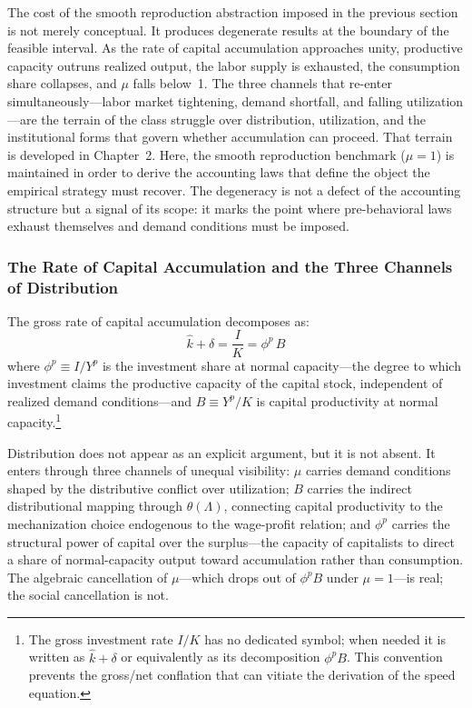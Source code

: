 The cost of the smooth reproduction abstraction imposed in the previous section is not merely conceptual. It produces degenerate results at the boundary of the feasible interval. As the rate of capital accumulation approaches unity, productive capacity outruns realized output, the labor supply is exhausted, the consumption share collapses, and $\mu$ falls below~1. The three channels that re-enter simultaneously---labor market tightening, demand shortfall, and falling utilization---are the terrain of the class struggle over distribution, utilization, and the institutional forms that govern whether accumulation can proceed. That terrain is developed in Chapter~2. Here, the smooth reproduction benchmark ($\mu = 1$) is maintained in order to derive the accounting laws that define the object the empirical strategy must recover. The degeneracy is not a defect of the accounting structure but a signal of its scope: it marks the point where pre-behavioral laws exhaust themselves and demand conditions must be imposed.


\subsubsection{The Rate of Capital Accumulation and the Three Channels of Distribution}
\label{sec:rate_of_accumulation}

The gross rate of capital accumulation decomposes as:
%
\begin{equation}\label{eq:gross_rate}
	\hat{k} + \delta = \frac{I}{K} = \phi^p \, B
\end{equation}
%
where $\phi^p \equiv I/Y^p$ is the investment share at normal capacity---the degree to which investment claims the productive capacity of the capital stock, independent of realized demand conditions---and $B \equiv Y^p/K$ is capital productivity at normal capacity.\footnote{The gross investment rate $I/K$ has no dedicated symbol; when needed it is written as $\hat{k} + \delta$ or equivalently as its decomposition $\phi^p B$. This convention prevents the gross/net conflation that can vitiate the derivation of the speed equation.}

Distribution does not appear as an explicit argument, but it is not absent. It enters through three channels of unequal visibility: $\mu$ carries demand conditions shaped by the distributive conflict over utilization; $B$ carries the indirect distributional mapping through $\theta(\Lambda)$, connecting capital productivity to the mechanization choice endogenous to the wage-profit relation; and $\phi^p$ carries the structural power of capital over the surplus---the capacity of capitalists to direct a share of normal-capacity output toward accumulation rather than consumption. The algebraic cancellation of $\mu$---which drops out of $\phi^p B$ under $\mu = 1$---is real; the social cancellation is not.


